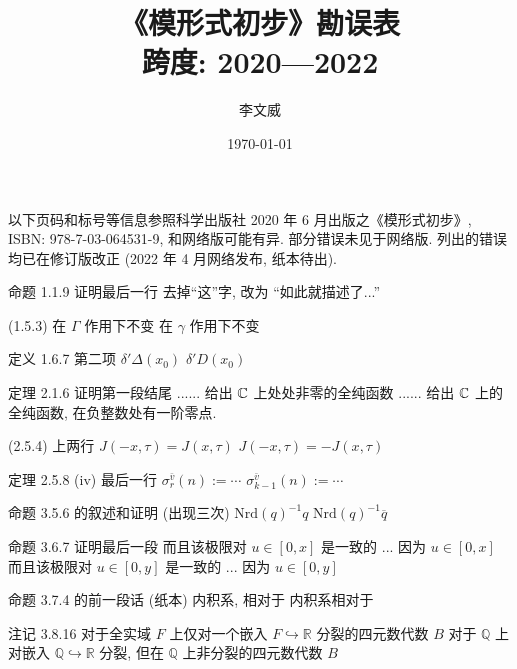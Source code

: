 \documentclass{AJerrata}
\title{\bfseries 《模形式初步》勘误表 \\ 跨度: 2020---2022}
\author{李文威}
\date{\today}
\begin{document}
	\maketitle
	以下页码和标号等信息参照科学出版社 2020 年 6 月出版之《模形式初步》, ISBN: 978-7-03-064531-9, 和网络版可能有异. 部分错误未见于网络版. 列出的错误均已在修订版改正 (2022 年 4 月网络发布, 纸本待出).
	
	\begin{Errata}
		\item[命题 1.1.9 证明最后一行]
		去掉``这''字, 改为 ``如此就描述了...''
		
		\item[(1.5.3)]
		\Orig 在 $\Gamma$ 作用下不变
		\Corr 在 $\gamma$ 作用下不变
		
		\item[定义 1.6.7 第二项]
		\Orig $\delta' \Delta(x_0)$
		\Corr $\delta' D(x_0)$
		
		\item[定理 2.1.6 证明第一段结尾]
		\Orig ...... 给出 $\mathbb{C}$ 上处处非零的全纯函数
		\Corr ...... 给出 $\mathbb{C}$ 上的全纯函数, 在负整数处有一阶零点. 

		\item[(2.5.4) 上两行]
		\Orig $J(-x, \tau) = J(x, \tau)$
		\Corr $J(-x, \tau) = -J(x, \tau)$

        \item[定理 2.5.8 (iv) 最后一行]
        \Orig $\sigma^{\bar{v}}_r(n) := \cdots$
        \Corr $\sigma^{\bar{v}}_{k-1}(n) := \cdots$
		
		\item[命题 3.5.6 的叙述和证明 (出现三次)]
		\Orig $\mathrm{Nrd}(q)^{-1} q$
		\Corr $\mathrm{Nrd}(q)^{-1} \overline{q}$ 
		
		\item[命题 3.6.7 证明最后一段]
		\Orig 而且该极限对 $u \in [0,x]$ 是一致的 ... 因为 $u \in [0,x]$
		\Corr 而且该极限对 $u \in [0,y]$ 是一致的 ... 因为 $u \in [0,y]$
		
		\item[命题 3.7.4 的前一段话 (纸本)]
		\Orig 内积系, 相对于
		\Corr 内积系相对于
		
		\item[注记 3.8.16]
		\Orig 对于全实域 $F$ 上仅对一个嵌入 $F \hookrightarrow \mathbb{R}$ 分裂的四元数代数 $B$
		\Corr 对于 $\mathbb{Q}$ 上对嵌入 $\mathbb{Q} \hookrightarrow \mathbb{R}$ 分裂, 但在 $\mathbb{Q}$ 上非分裂的四元数代数 $B$ 
		

\end{Errata}
\end{document}
